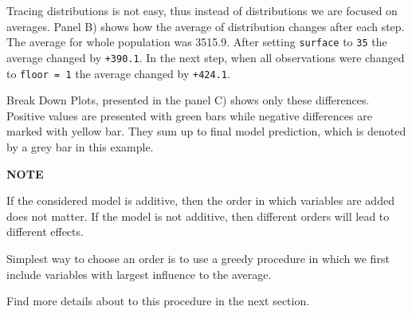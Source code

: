 \documentclass[]{book}
\theoremstyle{definition}
\theoremstyle{definition}
\theoremstyle{definition}
\theoremstyle{remark}
\begin{document}
Tracing distributions is not easy, thus instead of distributions we are
focused on averages. Panel B) shows how the average of distribution
changes after each step. The average for whole population was 3515.9.
After setting \texttt{surface} to \texttt{35} the average changed by
\texttt{+390.1}. In the next step, when all observations were changed to
\texttt{floor\ =\ 1} the average changed by \texttt{+424.1}.

Break Down Plots, presented in the panel C) shows only these
differences. Positive values are presented with green bars while
negative differences are marked with yellow bar. They sum up to final
model prediction, which is denoted by a grey bar in this example.

\textbf{NOTE}

If the considered model is additive, then the order in which variables
are added does not matter. If the model is not additive, then different
orders will lead to different effects.

Simplest way to choose an order is to use a greedy procedure in which we
first include variables with largest influence to the average.

Find more details about to this procedure in the next section.
\end{document}
